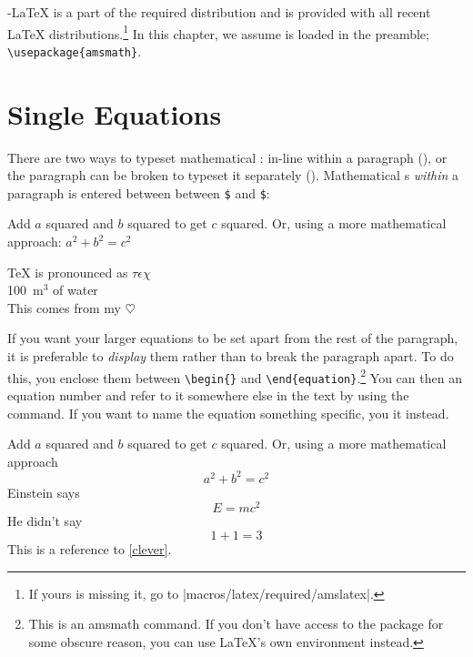 \AmS-\LaTeX{} is a part of the required distribution and is provided
with all recent \LaTeX{} distributions.\footnote{If yours is missing it, go to
  \CTAN|macros/latex/required/amslatex|.} In this chapter, we assume
   is loaded in the preamble; \verb|\usepackage{amsmath}|.

\section{Single Equations}
  
There are two ways to typeset mathematical : in-line within a paragraph
(\emph{}), or the paragraph can be broken to 
typeset it separately (\textit{}). Mathematical s 
\emph{within} a paragraph is entered between  %
between \texttt{\$} and \texttt{\$}:
\begin{example}
Add $a$ squared and $b$ squared
to get $c$ squared. Or, using 
a more mathematical approach:
$a^2 + b^2 = c^2$
\end{example}
\begin{example}
\TeX{} is pronounced as 
$\tau\epsilon\chi$\\[5pt]
100~m$^{3}$ of water\\[5pt]
This comes from my $\heartsuit$
\end{example}

If you want your larger equations to be set apart
from the rest of the paragraph, it is preferable to \emph{display} them
rather than to break the paragraph apart.
To do this, you enclose them between \verb|\begin{|\verb|}| and
\verb|\end{equation}|.\footnote{This is an \textsf{amsmath} command. If you don't
have access to the package for some obscure reason, you can use \LaTeX's own
 environment instead.} You can then  an equation number and refer to
it somewhere else in the text by using the  command. If you want to
name the equation something specific, you  it instead.
\begin{example}
Add $a$ squared and $b$ squared
to get $c$ squared. Or, using
a more mathematical approach
 \begin{equation}
   a^2 + b^2 = c^2
 \end{equation}
Einstein says
 \begin{equation}
   E = mc^2 \label{clever}
 \end{equation}
He didn't say
 \begin{equation}
  1 + 1 = 3 \tag{dumb}
 \end{equation}
This is a reference to 
\eqref{clever}. 
\end{example}

